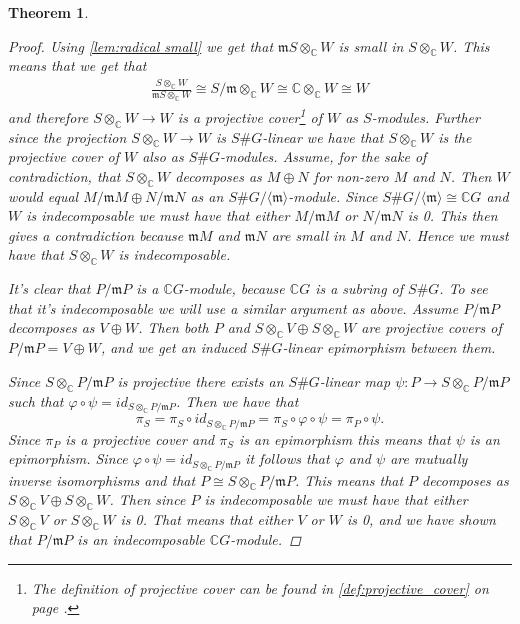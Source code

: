 \documentclass[11pt, a4paper, english]{article}
\newtheorem{theorem}{Theorem}[section]
\theoremstyle{definition}
\newcommand{\C}{\mathbb{C}}
\begin{document}
\begin{theorem}
\begin{proof}
Using \cref{lem:radical small} we get that $\mathfrak{m}S \otimes_\C W$ is small in $S\otimes_\C W$. This means that we get that 
\begin{align*}
\frac{S \otimes_\C W}{\mathfrak{m}S \otimes_\C W} \cong S/\mathfrak{m} \otimes_\C W \cong \C \otimes_\C W \cong W
\end{align*}
and therefore $S \otimes_\C W \to W$ is a projective cover\footnote{The definition of projective cover can be found in \cref{def:projective_cover} on page \pageref{def:projective_cover}.} of $W$ as $S$-modules. Further since the projection $S \otimes_\C W \to W$ is $S\#G$-linear we have that $S \otimes_\C W$ is the projective cover of $W$ also as $S\#G$-modules. Assume, for the sake of contradiction, that $S \otimes_\C W$ decomposes as $M \oplus N$ for non-zero $M$ and $N$. Then $W$ would equal $M/\mathfrak{m}M \oplus N/\mathfrak{m}N$ as an $S\#G/ \langle \mathfrak{m} \rangle$-module. Since $S\#G/ \langle \mathfrak{m} \rangle \cong \C G$ and $W$ is indecomposable we must have that either $M/\mathfrak{m}M$ or $N/\mathfrak{m}N$ is 0. This then gives a contradiction because $\mathfrak{m}M$ and $\mathfrak{m}N$ are small in $M$ and $N$. Hence we must have that $S \otimes_\C W$ is indecomposable.

It's clear that $P/\mathfrak{m}P$ is a $\C G$-module, because $\C G$ is a subring of $S\#G$. To see that it's indecomposable we will use a similar argument as above. Assume $P/\mathfrak{m}P$ decomposes as $V \oplus W$. Then both $P$ and $S\otimes_\C V \oplus S \otimes_\C W$ are projective covers of $P/\mathfrak{m}P = V\oplus W$, and we get an induced $S\#G$-linear epimorphism between them.

\begin{center}
\end{center}

Since $S \otimes_\C P/\mathfrak{m}P$ is projective there exists an $S\#G$-linear map $\psi: P \to S \otimes_\C P/\mathfrak{m}P$ such that $\varphi \circ \psi = id_{S \otimes_\C P/\mathfrak{m}P}$. Then we have that 
$$\pi_S = \pi_S \circ id_{S \otimes_\C P/\mathfrak{m}P} = \pi_S \circ \varphi \circ \psi = \pi_P \circ \psi.$$
Since $\pi_P$ is a projective cover and $\pi_S$ is an epimorphism this means that $\psi$ is an epimorphism. Since $\varphi \circ \psi = id_{S \otimes_\C P/\mathfrak{m}P}$ it follows that $\varphi$ and $\psi$ are mutually inverse isomorphisms and that $P \cong S \otimes_\C P/\mathfrak{m}P$. This means that $P$ decomposes as $S\otimes_\C V \oplus S \otimes_\C W$. Then since $P$ is indecomposable we must have that either $S \otimes_\C V$ or $S\otimes_\C W$ is 0. That means that either $V$ or $W$ is 0, and we have shown that $P/\mathfrak{m}P$ is an indecomposable $\C G$-module.


\end{proof}
\end{theorem}
\end{document}
